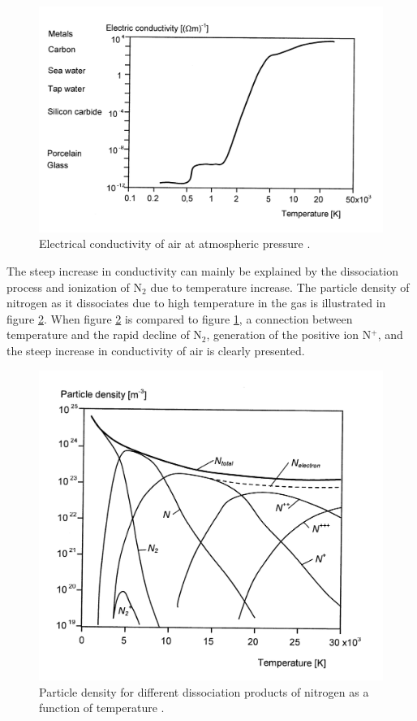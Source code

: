 \documentclass[10pt,a4paper,twoside]{article}
\begin{document}
\begin{figure}[H]
\centering
\includegraphics[scale=0.8]{Bilder/Theory/airConduct.png}
\caption{Electrical conductivity of air at atmospheric pressure \cite{bib:HVEbreak}.} \label{fig:condAir}
\end{figure}

The steep increase in conductivity can mainly be explained by the dissociation process and ionization of N$_2$ due to temperature increase. The particle density of nitrogen as it dissociates due to high temperature in the gas is illustrated in figure \ref{fig:Ndensi}. When figure \ref{fig:Ndensi} is compared to figure \ref{fig:condAir}, a connection between temperature and the rapid decline of N$_2$, generation of the positive ion N$^+$, and the steep increase in conductivity of air is clearly presented.

\begin{figure}[H]
\centering
\includegraphics[scale=0.8]{Bilder/Theory/particleDensNit.png}
\caption{Particle density for different dissociation products of nitrogen as a function of temperature \cite{bib:HVEbreak}.} \label{fig:Ndensi}
\end{figure}
\end{document}
